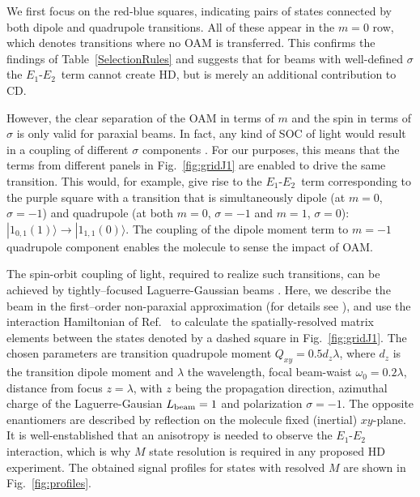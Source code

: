\documentclass[reprint,aps,prl,twocolumn,superscriptaddress,groupedaddress]{revtex4-2}
\newcommand{\eoet}{$E_1$-$E_2$}
\begin{document}
We first focus on the red-blue squares, indicating pairs of states connected by both dipole and quadrupole transitions. All of these appear in the $m=0$ row, which denotes transitions where no OAM is transferred. This confirms the findings of Table~\ref{SelectionRules} and suggests that for beams with well-defined $\sigma$ the \eoet ~term cannot create HD, but is merely an additional contribution to CD.

However, the clear separation of the OAM in terms of $m$ and the spin in terms of $\sigma$ is only valid for paraxial beams. In fact, any kind of SOC of light would result in a coupling of different $\sigma$ components \cite{Bliokh2015,Bliokh2023}. For our purposes, this means that the terms from different panels in Fig.~\ref{fig:gridJ1} are enabled to drive the same transition. This would, for example, give rise to the \eoet ~term corresponding to the purple square with a transition that is simultaneously dipole (at $m=0$, $\sigma=-1$) and quadrupole (at both $m=0$, $\sigma=-1$ and $m=1$, $\sigma=0$): $| 1_{0,1}(1) \rangle \to | 1_{1,1}(0) \rangle$. The coupling of the dipole moment term to $m=-1$ quadrupole component enables the molecule to sense the impact of OAM.




The spin-orbit coupling of light, required to realize such transitions, can be achieved by tightly--focused Laguerre-Gaussian beams \cite{Loeffler2011,Forbes2021nonparaxial,Forbes2021longitudinal}. Here, we describe the beam in the first--order non-paraxial approximation \cite{Lax1975} (for details see \cite{Note1}), and use the interaction Hamiltonian of Ref.~\cite{Maslov2024,Maslov_Thesis} to calculate the spatially-resolved matrix elements between the states denoted by a dashed square in Fig.~\ref{fig:gridJ1}. The chosen parameters are transition quadrupole moment $Q_{xy}=0.5d_z\lambda$, where $d_z$ is the transition dipole moment and $\lambda$ the wavelength, focal beam-waist $\omega_0=0.2\lambda$, distance from focus $z=\lambda$, with $z$ being the propagation direction, azimuthal charge of the Laguerre-Gausian $L_{\rm beam}=1$ and polarization $\sigma=-1$. The opposite enantiomers are described by reflection on the molecule fixed (inertial) $xy$-plane. It is well-enstablished \cite{Buckingham1971, Power1975} that an anisotropy is needed to observe the \eoet~ interaction, which is why $M$ state resolution is required in any proposed HD experiment. The obtained signal profiles for states with resolved $M$ are shown in Fig.~\ref{fig:profiles}.
\end{document}

